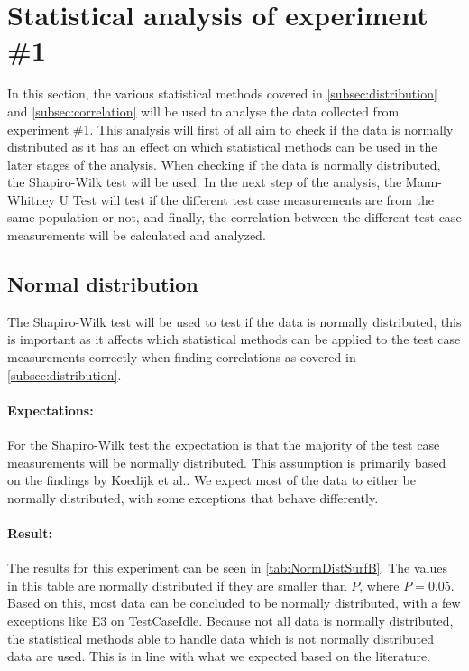 \section{Statistical analysis of experiment \#1}\label{sec:Stat1}

In this section, the various statistical methods covered in \cref{subsec:distribution} and \cref{subsec:correlation} will be used to analyse the data collected from experiment \#1. This analysis will first of all aim to check if the data is normally distributed as it has an effect on which statistical methods can be used in the later stages of the analysis. When checking if the data is normally distributed, the Shapiro-Wilk test will be used. In the next step of the analysis, the Mann-Whitney U Test will test if the different test case measurements are from the same population or not, and finally, the correlation between the different test case measurements will be calculated and analyzed.

\subsection{Normal distribution}\label{subsec:NormalDist1}
The Shapiro-Wilk test will be used to test if the data is normally distributed, this is important as it affects which statistical methods can be applied to the test case measurements correctly when finding correlations as covered in \cref{subsec:distribution}. 

\paragraph{Expectations:} For the Shapiro-Wilk test the expectation is that the majority of the test case measurements will be normally distributed. This assumption is primarily based on the findings by Koedijk et al.\cite{Koedijk2022diff}. We expect most of the data to either be normally distributed, with some exceptions that behave differently.

\paragraph{Result:} The results for this experiment can be seen in \cref{tab:NormDistSurfB}. The values in this table are normally distributed if they are smaller than $P$, where $P = 0.05$. Based on this, most data can be concluded to be normally distributed, with a few exceptions like E3 on TestCaseIdle. Because not all data is normally distributed, the statistical methods able to handle data which is not normally distributed data are used. This is in line with what we expected based on the literature.

